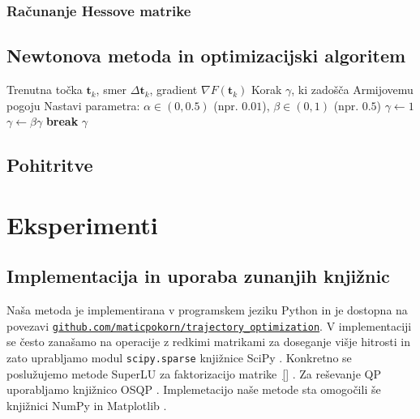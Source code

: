 \documentclass[mat2, tisk]{fmfdelo}
\begin{document}
\subsubsection{Računanje Hessove matrike}

\subsection{Newtonova metoda in optimizacijski algoritem}

\begin{algorithm}
\caption{Linijsko iskanje z vračanjem (Backtracking Line Search)}
\label{alg:backtracking}
\begin{algorithmic}[1]
\REQUIRE Trenutna točka $\mathbf{t}_k$, smer $\Delta \mathbf{t}_k$, gradient $\nabla F(\mathbf{t}_k)$
\ENSURE Korak $\gamma$, ki zadošča Armijovemu pogoju
\STATE Nastavi parametra: $\alpha \in (0, 0.5)$ (npr. $0.01$), $\beta \in (0, 1)$ (npr. $0.5$)
\STATE $\gamma \leftarrow 1$
    \STATE $\gamma \leftarrow \beta \gamma$
    \IF{$\gamma < \epsilon$}
        \STATE \textbf{break} 
    \ENDIF
\ENDWHILE
\RETURN $\gamma$
\end{algorithmic}
\end{algorithm}

\subsection{Pohitritve}

\section{Eksperimenti}
\label{sec:eksperimenti}

\subsection{Implementacija in uporaba zunanjih knjižnic}
Naša metoda je implementirana v programskem jeziku Python in je dostopna na povezavi \href{https://github.com/maticpokorn/trajectory_optimization}{\texttt{github.com/maticpokorn/trajectory\_optimization}}. V implementaciji se često zanašamo na operacije z redkimi matrikami za doseganje višje hitrosti in zato uprabljamo modul \texttt{scipy.sparse} knjižnice SciPy \cite{2020SciPy-NMeth}. Konkretno se poslužujemo metode SuperLU za faktorizacijo matrike~\eqref{} \cite{superlu1997superlu}. Za reševanje QP uporabljamo knjižnico OSQP \cite{osqp}. Implemetacijo naše metode sta omogočili še knjižnici NumPy \cite{harris2020array} in Matplotlib \cite{Hunter:2007}.
\end{document}

